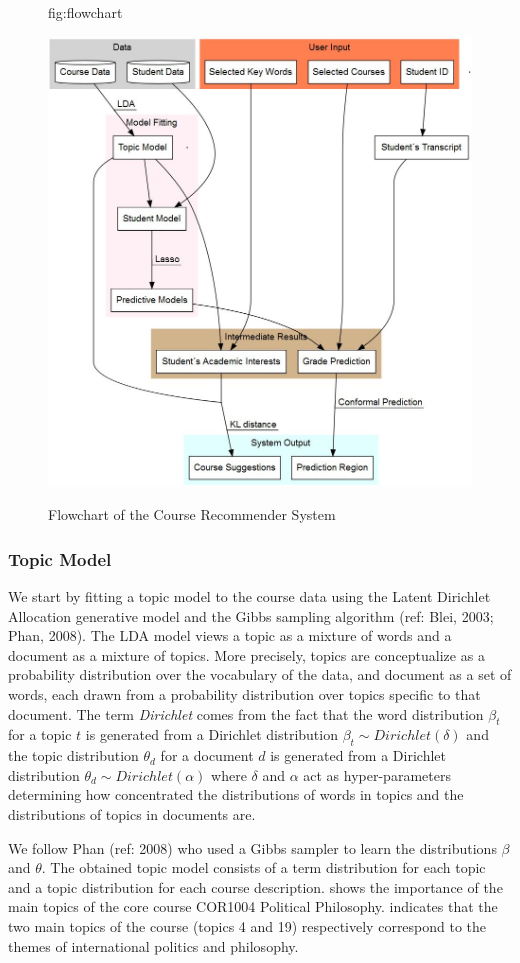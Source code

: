 \documentclass[pmlr]{jmlr}%
\begin{document}
\begin{figure}[htbp]
	\floatconts
	{fig:flowchart}
	{\caption{Flowchart of the Course Recommender System}}
	{\includegraphics[width=0.5\linewidth]{figures/flowchart}}
\end{figure}

\subsubsection{Topic Model}
\label{sec:tm}
We start by fitting a topic model to the course data using the Latent Dirichlet Allocation generative model and the Gibbs sampling algorithm (ref: Blei, 2003; Phan, 2008). The LDA model views a topic as a mixture of words and a document as a mixture of topics. More precisely, topics are conceptualize as a probability distribution over the vocabulary of the data, and document as a set of words, each drawn from a probability distribution over topics specific to that document. The term \textit{Dirichlet} comes from the fact that the word distribution $\beta_{t}$ for a topic $t$ is generated from a Dirichlet distribution $\beta_{t} \sim Dirichlet(\delta)$ and the topic distribution $\theta_{d}$ for a document $d$ is generated from a Dirichlet distribution $\theta_{d} \sim Dirichlet(\alpha)$ where $\delta$ and $\alpha$ act as hyper-parameters determining how concentrated the distributions of words in topics and the distributions of topics in documents are.

We follow Phan (ref: 2008) who used a Gibbs sampler to learn the distributions $\beta$ and $\theta$. The obtained topic model consists of a term distribution for each topic and a topic distribution for each course description.  shows the importance of the main topics of the core course COR1004 Political Philosophy.  indicates that the two main topics of the course (topics 4 and 19) respectively correspond to the themes of international politics and philosophy.
\end{document}

